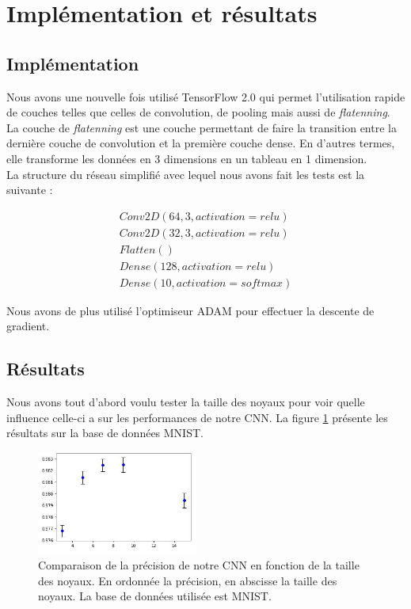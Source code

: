 \section{Implémentation et résultats}

\subsection{Implémentation}

Nous avons une nouvelle fois utilisé TensorFlow 2.0 qui permet l'utilisation rapide de couches telles que celles de convolution, de pooling mais aussi de \textit{flatenning}. La couche de \textit{flatenning} est une couche permettant de faire la transition entre la dernière couche de convolution et la première couche dense. En d'autres termes, elle transforme les données en 3 dimensions en un tableau en 1 dimension.\\
La structure du réseau simplifié avec lequel nous avons fait les tests est la suivante :

\[ \begin{array}{lcr}
	Conv2D(64, 3, activation=relu) \\
    Conv2D(32, 3, activation=relu) \\
    Flatten() \\
    Dense(128, activation=relu) \\
    Dense(10, activation=softmax)\end{array}\]

Nous avons de plus utilisé l'optimiseur ADAM pour effectuer la descente de gradient.

\subsection{Résultats}

Nous avons tout d'abord voulu tester la taille des noyaux pour voir quelle influence celle-ci a sur les performances de notre CNN. La figure \ref{resultat_noyaux} présente les résultats sur la base de données MNIST.

\begin{figure}[!h]
\centering
\includegraphics[width=150pt]{images/cnn/resultat_noyau.png}
\caption{Comparaison de la précision de notre CNN en fonction de la taille des noyaux. En ordonnée la précision, en abscisse la taille des noyaux. La base de données utilisée est MNIST.}
\label{resultat_noyaux}
\end{figure}

